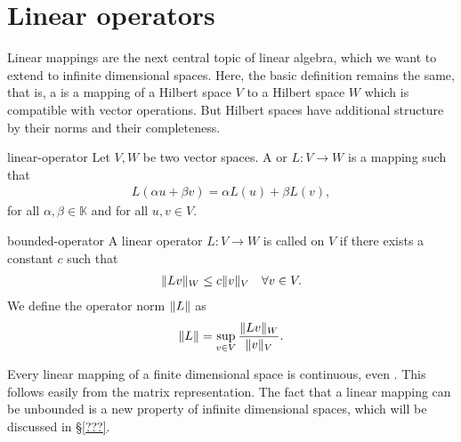 \section{Linear operators}

\begin{intro}
  Linear mappings are the next central topic of linear algebra, which
  we want to extend to infinite dimensional spaces. Here, the basic
  definition remains the same, that is, a  is
  a mapping of a Hilbert space $V$ to a Hilbert space $W$ which is
  compatible with vector operations. But Hilbert spaces have
  additional structure by their norms and their completeness.
\end{intro}

\begin{Definition}{linear-operator}
  Let $V,W$ be two vector spaces. A  or
   $L\colon V\to W$ is a mapping such that
  \begin{gather*}
    L(\alpha u+\beta v) = \alpha L(u) + \beta L(v),
  \end{gather*}
  for all $\alpha,\beta\in\mathbb K$ and for all $u,v\in V$.
\end{Definition}

\begin{Definition}{bounded-operator}
  A linear operator $L\colon V\to W$ is called  on $V$
  if there exists a constant $c$ such that
  \begin{gather}
    \label{eq:lafa:11}
    \lVert L v\rVert_W \le c \lVert v\rVert_V
    \quad\forall v\in V.
  \end{gather}
  We define the operator norm $\lVert L\rVert$ as
  \begin{gather}
    \label{eq:lafa:12}
    \lVert L\rVert = \sup_{v\in V} \frac{\lVert L v\rVert_W}{\lVert v\rVert_V}.
  \end{gather}
\end{Definition}

\begin{remark}
  Every linear mapping of a finite dimensional space is continuous,
  even . This follows easily from the
  matrix representation. The fact that a linear mapping can be
  unbounded is a new property of infinite dimensional spaces, which
  will be discussed in §\ref{???}.
\end{remark}

